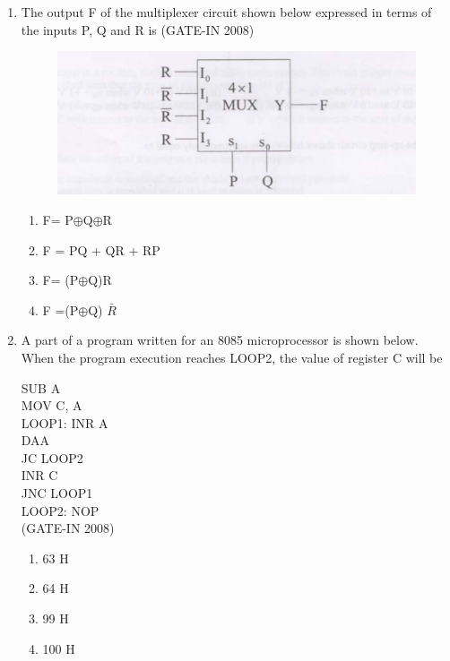 \documentclass[journal,12pt,onecolumn]{IEEEtran}
\theoremstyle{remark}
\begin{document}
\begin{enumerate}
    \item  The output F of the multiplexer circuit shown below expressed in terms of the inputs P, Q and R is \hfill (GATE-IN 2008)
    \begin{figure}[H]
    \centering
    \includegraphics[width=0.5\columnwidth]{figs/i23.jpg}
    \caption{}
    \label{fig:placeholder23}
\end{figure}
\begin{multicols}{4}
    \begin{enumerate} 
        \item  F= P$\oplus$Q$\oplus$R
        \item  F = PQ + QR + RP
        \item  F= (P$\oplus$Q)R
        \item  F =(P$\oplus$Q) $\bar{R}$
    \end{enumerate}
    \end{multicols}
    
    \item A part of a program written for an 8085 microprocessor is shown below. When the program
execution reaches LOOP2, the value of register C will be

 SUB A\\ 
 MOV C, A  \\
 LOOP1: INR A\\  
    DAA  \\
    JC LOOP2\\  
    INR C  \\
    JNC LOOP1\\  
LOOP2: NOP\\
 \hfill (GATE-IN 2008)
 \begin{multicols}{4}
    \begin{enumerate} 
        \item 63 H
        \item 64 H
        \item 99 H
        \item 100 H
    \end{enumerate}
    \end{multicols}
    

\end{enumerate}
\end{document}
